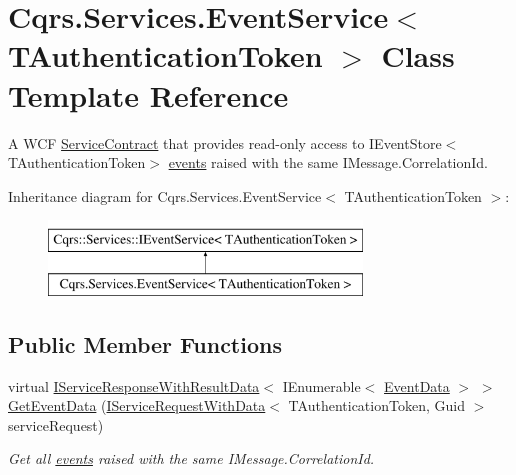 \hypertarget{classCqrs_1_1Services_1_1EventService}{}\section{Cqrs.\+Services.\+Event\+Service$<$ T\+Authentication\+Token $>$ Class Template Reference}
\label{classCqrs_1_1Services_1_1EventService}


A W\+CF \hyperlink{}{Service\+Contract} that provides read-\/only access to I\+Event\+Store$<$\+T\+Authentication\+Token$>$ \hyperlink{}{events} raised with the same I\+Message.\+Correlation\+Id.  


Inheritance diagram for Cqrs.\+Services.\+Event\+Service$<$ T\+Authentication\+Token $>$\+:\begin{figure}[H]
\begin{center}
\leavevmode
\includegraphics[height=2.000000cm]{classCqrs_1_1Services_1_1EventService}
\end{center}
\end{figure}
\subsection*{Public Member Functions}
\begin{DoxyCompactItemize}
\item 
virtual \hyperlink{interfaceCqrs_1_1Services_1_1IServiceResponseWithResultData}{I\+Service\+Response\+With\+Result\+Data}$<$ I\+Enumerable$<$ \hyperlink{classCqrs_1_1Events_1_1EventData}{Event\+Data} $>$ $>$ \hyperlink{classCqrs_1_1Services_1_1EventService_a9a68d774ac754e39be56d3e0449f14d7_a9a68d774ac754e39be56d3e0449f14d7}{Get\+Event\+Data} (\hyperlink{interfaceCqrs_1_1Services_1_1IServiceRequestWithData}{I\+Service\+Request\+With\+Data}$<$ T\+Authentication\+Token, Guid $>$ service\+Request)
\begin{DoxyCompactList}\small\item\em Get all \hyperlink{}{events} raised with the same I\+Message.\+Correlation\+Id. \end{DoxyCompactList}\end{DoxyCompactItemize}
